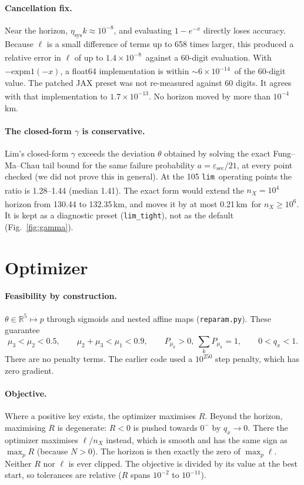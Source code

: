 \documentclass[11pt,a4paper]{article}
\newcommand{\typed}{\textsuperscript{\dag}}
\newcommand{\plim}{\texttt{lim}}
\newcommand{\esec}{\varepsilon_{\mathrm{sec}}}
\begin{document}
\paragraph{Cancellation fix.} Near the horizon, $\eta_{\mathrm{sys}}k\approx10^{-8}$, and evaluating
$1-e^{-x}$ directly loses accuracy. Because $\ell$ is a small difference of terms up to 658 times larger, this
produced a relative error in $\ell$ of up to $1.4\times10^{-8}$\typed\ against a 60-digit evaluation. With
$-\mathrm{expm1}(-x)$, a float64 implementation is within $\sim6\times10^{-14}$\typed\ of the 60-digit value. The
patched JAX preset was not re-measured against 60 digits. It agrees with that implementation to
$1.7\times10^{-13}$\typed. No horizon moved by more than
$10^{-4}$\,km.

\paragraph{The closed-form $\gamma$ is conservative.} Lim's closed-form $\gamma$ exceeds the deviation
$\theta$ obtained by solving the exact Fung--Ma--Chau tail bound for the same failure probability $a=\esec/21$, at
every point checked (we did not prove this in general). At the 105 \plim\ operating points the ratio is 1.28--1.44 (median 1.41)\typed. The exact form would extend the
$n_X=10^4$ horizon from 130.44 to 132.35\,km\typed, and moves it by at most 0.21\,km\typed\ for $n_X\ge10^6$. It
is kept as a diagnostic preset (\texttt{lim\_tight}), not as the default (Fig.~\ref{fig:gamma}).

\section{Optimizer}\label{sec:optimizer}
\paragraph{Feasibility by construction.} $\theta\in\mathbb{R}^5\mapsto p$ through sigmoids and nested affine maps
(\texttt{reparam.py}). These guarantee
\[
  \mu_3<\mu_2<0.5,\qquad \mu_2+\mu_3<\mu_1<0.9,\qquad P_{\mu_k}>0,\ \textstyle\sum_k P_{\mu_k}=1,\qquad 0<q_x<1 .
\]
There are no penalty terms. The earlier code used a $10^{250}$ step penalty, which has zero gradient.

\paragraph{Objective.} Where a positive key exists, the optimizer maximises $R$. Beyond the horizon, maximising
$R$ is degenerate: $R<0$ is pushed towards $0^-$ by $q_x\to0$. There the optimizer maximises $\ell/n_X$ instead,
which is smooth and has the same sign as $\max_pR$ (because $N>0$). The horizon is then exactly the zero of
$\max_p\ell$. Neither $R$ nor $\ell$ is ever clipped. The objective is divided by its value at the best start, so
tolerances are relative ($R$ spans $10^{-2}$ to $10^{-11}$).
\end{document}
